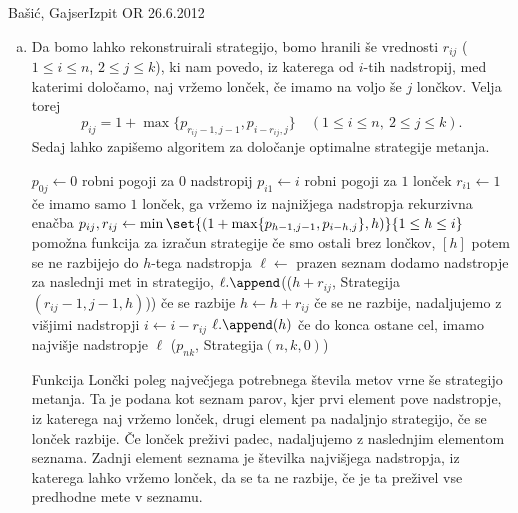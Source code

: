\begin{naloga}{Bašić, Gajser}{Izpit OR 26.6.2012}
\begin{odgovor}
\begin{enumerate}[(a)]
\item Da bomo lahko rekonstruirali strategijo,
bomo hranili še vrednosti $r_{ij}$ ($1 \le i \le n$, $2 \le j \le k$),
ki nam povedo, iz katerega od $i$-tih nadstropij, med katerimi določamo,
naj vržemo lonček, če imamo na voljo še $j$ lončkov.
Velja torej
$$
p_{ij} = 1 + \max\{p_{r_{ij}-1,j-1}, p_{i-r_{ij},j}\}
\quad (1 \le i \le n, \ 2 \le j \le k) .
$$
Sedaj lahko zapišemo algoritem za določanje optimalne strategije metanja.
\begin{small}
\begin{algorithmic}
        \State $p_{0j} \gets 0$ \hfill robni pogoji za $0$ nadstropij
    \EndFor
        \State $p_{i1} \gets i$ \hfill robni pogoji za $1$ lonček
        \State $r_{i1} \gets 1$ \hfill če imamo samo $1$ lonček,
                                       ga vržemo iz najnižjega nadstropja
         \hfill rekurzivna enačba
            \State $p_{ij}, r_{ij} \gets \min\set{(1 + \max\{p_{h-1,j-1},
                                                             p_{i-h,j}\}, h)}%
                                                 {1 \le h \le i}$
        \EndFor
    \EndFor
            \hfill pomožna funkcija za izračun strategije
         \hfill če smo ostali brez lončkov,
            \State \Return $[h]$
                \hfill potem se ne razbijejo do $h$-tega nadstropja
        \EndIf
        \State $\ell \gets$ prazen seznam
                \hfill dodamo nadstropje za naslednji met in strategijo,
            \State $\ell.\append$(($h + r_{ij}$,
                {\sc Strategija$(r_{ij}-1, j-1, h)$})) \hfill če se razbije
            \State $h \gets h + r_{ij}$
                \hfill če se ne razbije, nadaljujemo z višjimi nadstropji
            \State $i \gets i - r_{ij}$
        \EndWhile
        \State $\ell.\append(h)$
            \hfill če do konca ostane cel, imamo najvišje nadstropje
        \State \Return $\ell$
    \EndFunction
    \State \Return ($p_{nk}$, {\sc Strategija}$(n, k, 0)$)
\EndFunction
\end{algorithmic}
\end{small}
Funkcija {\sc Lončki} poleg največjega potrebnega števila metov
vrne še strategijo metanja.
Ta je podana kot seznam parov,
kjer prvi element pove nadstropje, iz katerega naj vržemo lonček,
drugi element pa nadaljnjo strategijo, če se lonček razbije.
Če lonček preživi padec, nadaljujemo z naslednjim elementom seznama.
Zadnji element seznama je številka najvišjega nadstropja,
iz katerega lahko vržemo lonček, da se ta ne razbije,
če je ta preživel vse predhodne mete v seznamu.


\end{enumerate}
\end{odgovor}
\end{naloga}
